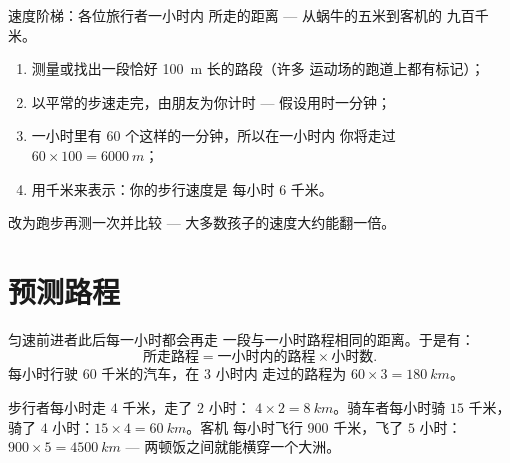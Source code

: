 \begin{omfigure}

{\small 速度阶梯：各位旅行者一小时内
所走的距离 --- 从蜗牛的五米到客机的
九百千米。}
\end{omfigure}

\begin{method}[测量自己的速度]\label{met:g5:speed-distance-time:measure}
\begin{enumerate}
  \item 测量或找出一段恰好 \qty{100}{m} 长的路段（许多
        运动场的跑道上都有标记）；
  \item 以平常的步速走完，由朋友为你计时 ---
        假设用时一分钟；
  \item 一小时里有 $60$ 个这样的一分钟，所以在一小时内
        你将走过 $60 \times 100 = \qty{6000}{m}$；
  \item 用千米来表示：你的步行速度是
        每小时 $6$ 千米。
\end{enumerate}
改为跑步再测一次并比较 --- 大多数孩子的速度大约能翻一倍。
\end{method}

\section{预测路程}

\begin{proposition}[由速度求路程]\label{prop:g5:speed-distance-time:distance}
匀速前进者此后每一小时都会再走
一段与一小时路程相同的距离。于是有：
\[
\text{所走路程} = \text{一小时内的路程} \times
\text{小时数}.
\]
每小时行驶 $60$ 千米的汽车，在 $3$ 小时内
走过的路程为 $60 \times 3 = \qty{180}{km}$。
\end{proposition}

\begin{example}[行程计算]\label{ex:g5:speed-distance-time:journeys}
步行者每小时走 $4$ 千米，走了 $2$ 小时：
$4 \times 2 = \qty{8}{km}$。骑车者每小时骑 $15$ 千米，
骑了 $4$ 小时：$15 \times 4 = \qty{60}{km}$。客机
每小时飞行 $900$ 千米，飞了 $5$ 小时：$900 \times 5 =
\qty{4500}{km}$ --- 两顿饭之间就能横穿一个大洲。
\end{example}

